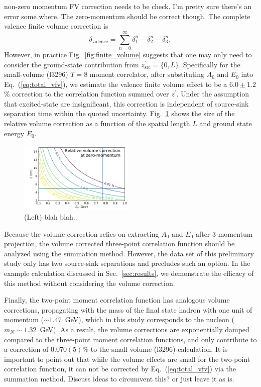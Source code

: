 \documentclass[prd,aps,twocolumn,superscriptaddress,tightenlines,nofootinbib,floatfix,preprintnumbers,10pt]{revtex4-1}
\begin{document}
{\color{red} non-zero momentum FV correction needs to be check. I'm pretty sure there's an error some where. The zero-momentum should be correct though.} The complete valence finite volume correction is
\begin{equation}
\delta_{\mathrm{valence}} = \sum_{n=0}^\infty \delta^n_1 - \delta^n_2 - \delta^n_3,
\label{eq:total_vfv}
\end{equation}
However, in practice Fig.~\ref{fig:finite_volume} suggests that one may only need to consider the ground-state contribution from $z^\prime_{\mathrm{src}}=\{0, L\}$. Specifically for the small-volume (l3296) $T=8$ moment correlator, after substituting $A_0$ and $E_0$ into Eq.~(\ref{eq:total_vfv}), we estimate the valence finite volume effect to be a $6.0\pm 1.2$\% correction to the correlation function summed over $z^\prime$. Under the assumption that excited-state are insignificant, this correction is independent of source-sink separation time within the quoted uncertainty. Fig.~\ref{fig:fv_relerr} shows the size of the relative volume correction as a function of the spatial length $L$ and ground state energy $E_0$.

\begin{figure}[t]{
		\includegraphics[width=0.49\textwidth]{figures/fv_relerr_0mom.pdf}
		\caption{(Left) blah blah..}
		\label{fig:fv_relerr}
}\end{figure}

Because the volume correction relies on extracting $A_0$ and $E_0$ after 3-momentum projection, the volume corrected three-point correlation function should be analyzed using the summation method. However, the data set of this preliminary study only has two source-sink separations and precludes such an option. In the example calculation discussed in Sec.~\ref{sec:results}, we demonstrate the efficacy of this method without considering the volume correction.

Finally, the two-point moment correlation function has analogous volume corrections, propagating with the mass of the final state hadron with one unit of momentum ($\sim 1.47$~GeV), which in this study corresponds to the nucleon ($m_N \sim 1.32$~GeV). As a result, the volume corrections are exponentially damped compared to the three-point moment correlation functions, and only contribute to a correction of $0.070(5)$\% to the small volume (l3296) calculation. It is important to point out that while the volume effects are small for the two-point correlation function, it can not be corrected by Eq.~(\ref{eq:total_vfv}) via the summation method. {\color{red} Discuss ideas to circumvent this? or just leave it as is.}
\end{document}
